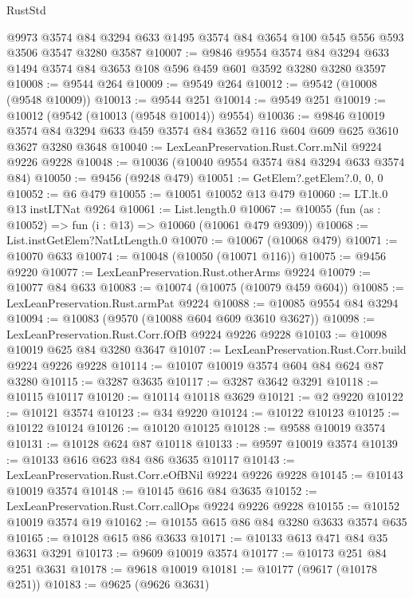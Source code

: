 \begin{lexlean}{RustStd}
\begin{coremodule}
    @9973
    @3574
    @84
    @3294
    @633
    @1495
    @3574
    @84
    @3654
    @100
    @545
    @556
    @593
    @3506
    @3547
    @3280
    @3587
@10007 := @9846
    @9554
    @3574
    @84
    @3294
    @633
    @1494
    @3574
    @84
    @3653
    @108
    @596
    @459
    @601
    @3592
    @3280
    @3280
    @3597
@10008 := @9544 @264
@10009 := @9549 @264
@10012 := @9542 (@10008 (@9548 @10009))
@10013 := @9544 @251
@10014 := @9549 @251
@10019 := @10012 (@9542 (@10013 (@9548 @10014)) @9554)
@10036 := @9846
    @10019
    @3574
    @84
    @3294
    @633
    @459
    @3574
    @84
    @3652
    @116
    @604
    @609
    @625
    @3610
    @3627
    @3280
    @3648
@10040 := LexLeanPreservation.Rust.Corr.mNil @9224 @9226 @9228
@10048 := @10036 (@10040 @9554 @3574 @84 @3294 @633 @3574 @84)
@10050 := @9456 (@9248 @479)
@10051 := GetElem?.getElem?.{0, 0, 0}
@10052 := @6 @479
@10055 := @10051 @10052 @13 @479
@10060 := LT.lt.{0} @13 instLTNat @9264
@10061 := List.length.{0}
@10067 := @10055 (fun (as : @10052) => fun (i : @13) => @10060 (@10061 @479 @9309))
@10068 := List.instGetElem?NatLtLength.{0}
@10070 := @10067 (@10068 @479)
@10071 := @10070 @633
@10074 := @10048 (@10050 (@10071 @116))
@10075 := @9456 @9220
@10077 := LexLeanPreservation.Rust.otherArms @9224
@10079 := @10077 @84 @633
@10083 := @10074 (@10075 (@10079 @459 @604))
@10085 := LexLeanPreservation.Rust.armPat @9224
@10088 := @10085 @9554 @84 @3294
@10094 := @10083 (@9570 (@10088 @604 @609 @3610 @3627))
@10098 := LexLeanPreservation.Rust.Corr.fOfB @9224 @9226 @9228
@10103 := @10098 @10019 @625 @84 @3280 @3647
@10107 := LexLeanPreservation.Rust.Corr.build @9224 @9226 @9228
@10114 := @10107 @10019 @3574 @604 @84 @624 @87 @3280
@10115 := @3287 @3635
@10117 := @3287 @3642 @3291
@10118 := @10115 @10117
@10120 := @10114 @10118 @3629
@10121 := @2 @9220
@10122 := @10121 @3574
@10123 := @34 @9220
@10124 := @10122 @10123
@10125 := @10122 @10124
@10126 := @10120 @10125
@10128 := @9588 @10019 @3574
@10131 := @10128 @624 @87 @10118
@10133 := @9597 @10019 @3574
@10139 := @10133 @616 @623 @84 @86 @3635 @10117
@10143 := LexLeanPreservation.Rust.Corr.eOfBNil @9224 @9226 @9228
@10145 := @10143 @10019 @3574
@10148 := @10145 @616 @84 @3635
@10152 := LexLeanPreservation.Rust.Corr.callOps @9224 @9226 @9228
@10155 := @10152 @10019 @3574 @19
@10162 := @10155 @615 @86 @84 @3280 @3633 @3574 @635
@10165 := @10128 @615 @86 @3633
@10171 := @10133 @613 @471 @84 @35 @3631 @3291
@10173 := @9609 @10019 @3574
@10177 := @10173 @251 @84 @251 @3631
@10178 := @9618 @10019
@10181 := @10177 (@9617 (@10178 @251))
@10183 := @9625 (@9626 @3631)

\end{coremodule}
\end{lexlean}
